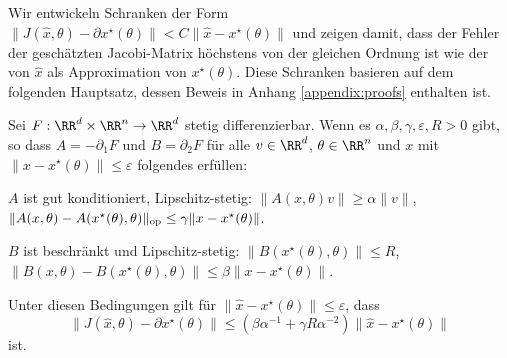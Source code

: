 Wir entwickeln Schranken der Form $\|J(\hat{x}, \theta) - \partial x^\star(\theta)\| < C \|\hat x - x^\star(\theta)\|$ und zeigen damit, dass der Fehler der geschätzten Jacobi-Matrix höchstens von der gleichen Ordnung ist wie der von $\hat x$ als Approximation von $x^{\star}(\theta)$. Diese Schranken basieren auf dem folgenden Hauptsatz, dessen Beweis in Anhang \ref{appendix:proofs} enthalten ist.
\begin{theorem}\label{thm:jacob}
Sei $F:\RR^d \times \RR^n \to \RR^d$ stetig differenzierbar. Wenn es $\alpha, \beta, \gamma, \varepsilon, R>0$ gibt, so dass $A = -\partial_1 F$ und $B = \partial_2 F$ für alle $v\in\RR^d$, $\theta \in \RR^n$ und $x$ mit $\|x - x^\star(\theta)\| \le \varepsilon$ folgendes erfüllen:

$A$ ist gut konditioniert, Lipschitz-stetig: $\|A(x, \theta) v \| \ge \alpha \|v\|$, $\|A(x, \theta) - A(x^\star(\theta), \theta)\|_{\textnormal{op}} \le \gamma \|x - x^\star(\theta)\|$.

$B$ ist beschränkt und Lipschitz-stetig: $\|B(x^\star(\theta), \theta)\| \le R$, $\|B(x, \theta) - B(x^\star(\theta), \theta)\| \le \beta \|x - x^\star(\theta)\|$.

Unter diesen Bedingungen gilt für $\|\hat x - x^\star(\theta)\| \le \varepsilon$, dass
\[
\|J(\hat x, \theta) - \partial x^\star (\theta)\| \le \left(\beta\alpha^{-1} + \gamma R \alpha^{-2}\right) \|\hat x - x^\star(\theta)\|
\]
ist.
\end{theorem}





